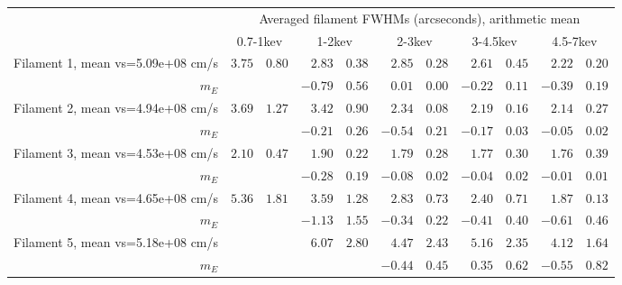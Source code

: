 \begin{tabular}{@{}rr@{ $\pm$ }lr@{ $\pm$ }lr@{ $\pm$ }lr@{ $\pm$ }lr@{ $\pm$ }l@{}}
\toprule
{} & \multicolumn{10}{c}{Averaged filament FWHMs (arcseconds), arithmetic mean} \\
\cmidrule(l){2-11}
 & \multicolumn{2}{c}{0.7-1kev} & \multicolumn{2}{c}{1-2kev} & \multicolumn{2}{c}{2-3kev} & \multicolumn{2}{c}{3-4.5kev} & \multicolumn{2}{c}{4.5-7kev}\\
\midrule
Filament 1, mean vs=5.09e+08 cm/s & $3.75$ & $0.80$ & $2.83$ & $0.38$ & $2.85$ & $0.28$ & $2.61$ & $0.45$ & $2.22$ & $0.20$\\
$m_E$ & {} & {} & $-0.79$ & $0.56$ & $0.01$ & $0.00$ & $-0.22$ & $0.11$ & $-0.39$ & $0.19$\\
Filament 2, mean vs=4.94e+08 cm/s & $3.69$ & $1.27$ & $3.42$ & $0.90$ & $2.34$ & $0.08$ & $2.19$ & $0.16$ & $2.14$ & $0.27$\\
$m_E$ & {} & {} & $-0.21$ & $0.26$ & $-0.54$ & $0.21$ & $-0.17$ & $0.03$ & $-0.05$ & $0.02$\\
Filament 3, mean vs=4.53e+08 cm/s & $2.10$ & $0.47$ & $1.90$ & $0.22$ & $1.79$ & $0.28$ & $1.77$ & $0.30$ & $1.76$ & $0.39$\\
$m_E$ & {} & {} & $-0.28$ & $0.19$ & $-0.08$ & $0.02$ & $-0.04$ & $0.02$ & $-0.01$ & $0.01$\\
Filament 4, mean vs=4.65e+08 cm/s & $5.36$ & $1.81$ & $3.59$ & $1.28$ & $2.83$ & $0.73$ & $2.40$ & $0.71$ & $1.87$ & $0.13$\\
$m_E$ & {} & {} & $-1.13$ & $1.55$ & $-0.34$ & $0.22$ & $-0.41$ & $0.40$ & $-0.61$ & $0.46$\\
Filament 5, mean vs=5.18e+08 cm/s & {} & {} & $6.07$ & $2.80$ & $4.47$ & $2.43$ & $5.16$ & $2.35$ & $4.12$ & $1.64$\\
$m_E$ & {} & {} & {} & {} & $-0.44$ & $0.45$ & $0.35$ & $0.62$ & $-0.55$ & $0.82$\\
\bottomrule
\end{tabular}
